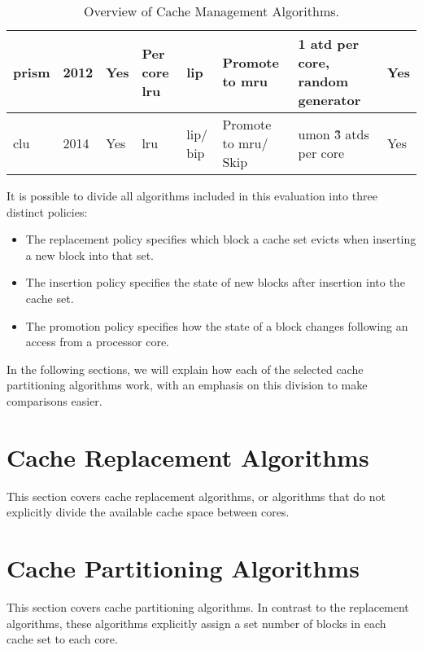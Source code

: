 \begin{table}[thb]
\begin{tabular}{|p{1.4cm}|p{0.5cm}|p{0.8cm}|p{1.2cm}|p{1.2cm}|p{1.4cm}|p{1.2cm}|p{1.0cm}|}
\gls{prism}                           & 2012                           & Yes                         & Per core \gls{lru}                  & \gls{lip}                            & Promote to \gls{mru}                 & 1 \gls{atd} per core, random generator                       & Yes  \\ \hline
\gls{clu}                             & 2014                           & Yes                         & \gls{lru}                              & \gls{lip}/ \gls{bip}                        & Promote to \gls{mru}/ Skip            & \gls{umon} \~3 \glspl{atd} per core                & Yes  \\ \hline
\end{tabular}
\caption{Overview of Cache Management Algorithms.}
\label{tbl:algorithms}
\end{table}
\clearpage

It is possible to divide all algorithms included in this evaluation into three distinct policies:
\begin{itemize}
\item The replacement policy specifies which block a cache set evicts when inserting a new block into that set.
\item The insertion policy specifies the state of new blocks after insertion into the cache set.
\item The promotion policy specifies how the state of a block changes following an access from a processor core.
\end{itemize}
In the following sections, we will explain how each of the selected cache partitioning algorithms work, with an emphasis on this division to make comparisons easier.

\section{Cache Replacement Algorithms}
This section covers cache replacement algorithms, or algorithms that do not explicitly divide the available cache space between cores.









\section{Cache Partitioning Algorithms}
This section covers cache partitioning algorithms.
In contrast to the replacement algorithms, these algorithms explicitly assign a set number of blocks in each cache set to each core.




